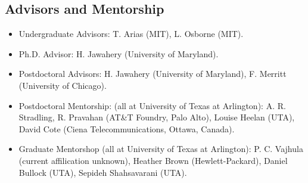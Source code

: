 \documentclass[11pt,]{article}
\begin{document}
\subsection*{Advisors and Mentorship}
\begin{itemize}
\item Undergraduate Advisors: T. Arias (MIT), L. Osborne (MIT).
\item Ph.D. Advisor: H. Jawahery (University of Maryland).
\item Postdoctoral Advisors:  H. Jawahery (University of Maryland), F. Merritt (University of Chicago).
\item Postdoctoral Mentorship:  (all at University of Texas at Arlington): A. R. Stradling, R. Pravahan (AT\&T Foundry, Palo Alto), Louise Heelan (UTA), David Cote (Ciena Telecommunications, Ottawa, Canada).
\item Graduate Mentorshop (all at University of Texas at Arlington): P. C. Vajhula (current affilication unknown), Heather Brown (Hewlett-Packard),  Daniel Bullock (UTA),  Sepideh Shahsavarani (UTA).
\end{itemize}
\end{document}
